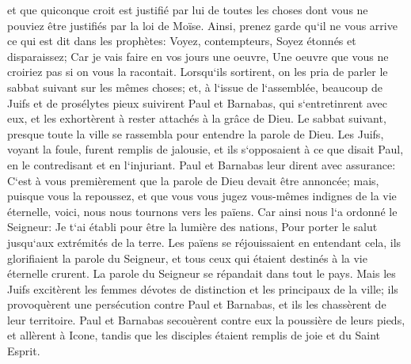 \verse et que quiconque croit est justifié par lui de toutes les choses dont vous ne pouviez être justifiés par la loi de Moïse. 
\verse Ainsi, prenez garde qu`il ne vous arrive ce qui est dit dans les prophètes: 
\verse Voyez, contempteurs, Soyez étonnés et disparaissez; Car je vais faire en vos jours une oeuvre, Une oeuvre que vous ne croiriez pas si on vous la racontait. 
\verse Lorsqu`ils sortirent, on les pria de parler le sabbat suivant sur les mêmes choses; 
\verse et, à l`issue de l`assemblée, beaucoup de Juifs et de prosélytes pieux suivirent Paul et Barnabas, qui s`entretinrent avec eux, et les exhortèrent à rester attachés à la grâce de Dieu. 
\verse Le sabbat suivant, presque toute la ville se rassembla pour entendre la parole de Dieu. 
\verse Les Juifs, voyant la foule, furent remplis de jalousie, et ils s`opposaient à ce que disait Paul, en le contredisant et en l`injuriant. 
\verse Paul et Barnabas leur dirent avec assurance: C`est à vous premièrement que la parole de Dieu devait être annoncée; mais, puisque vous la repoussez, et que vous vous jugez vous-mêmes indignes de la vie éternelle, voici, nous nous tournons vers les païens. 
\verse Car ainsi nous l`a ordonné le Seigneur: Je t`ai établi pour être la lumière des nations, Pour porter le salut jusqu`aux extrémités de la terre. 
\verse Les païens se réjouissaient en entendant cela, ils glorifiaient la parole du Seigneur, et tous ceux qui étaient destinés à la vie éternelle crurent. 
\verse La parole du Seigneur se répandait dans tout le pays. 
\verse Mais les Juifs excitèrent les femmes dévotes de distinction et les principaux de la ville; ils provoquèrent une persécution contre Paul et Barnabas, et ils les chassèrent de leur territoire. 
\verse Paul et Barnabas secouèrent contre eux la poussière de leurs pieds, et allèrent à Icone, 
\verse tandis que les disciples étaient remplis de joie et du Saint Esprit. 

